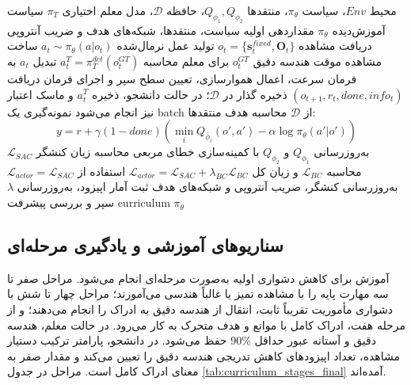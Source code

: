 \begin{algorithm}[htbp]
	\footnotesize
	\caption{فرآیند آموزش عامل  با سپر غیرفعال و لنگر رفتاری معلم}
	\label{alg:distilled_lstm_sac_training_final}
	\begin{algorithmic}[1]
		\REQUIRE محیط \(Env\)، سیاست \(\pi_\theta\)، منتقدها \(Q_{\phi_1},Q_{\phi_2}\)، حافظه \(\mathcal{D}\)، مدل معلم اختیاری \(\pi_T\)
		\ENSURE سیاست آموزش‌دیده \(\pi_\theta\)
		\STATE مقداردهی اولیه سیاست، منتقدها، شبکه‌های هدف و ضریب آنتروپی
		\STATE دریافت مشاهده \(o_t=\{\mathbf{s}^{fixed}_t,\mathbf{O}_t\}\)
		\STATE تولید عمل نرمال‌شده \(a_t\sim\pi_\theta(a|o_t)\)
		\STATE ساخت مشاهده موقت هندسه دقیق \(o^{GT}_t\) برای معلم
		\STATE محاسبه \(a^T_t=\pi_T^{det}(o^{GT}_t)\)
		\ENDIF
		\STATE تبدیل \(a_t\) به فرمان سرعت، اعمال هموارسازی، تعیین سطح سپر و اجرای فرمان
		\STATE دریافت \((o_{t+1},r_t,done,info_t)\)
		\STATE ذخیره گذار در \(\mathcal{D}\)؛ در حالت دانشجو، ذخیره \(a^T_t\) و ماسک اعتبار نیز انجام می‌شود
		\STATE نمونه‌گیری یک batch از \(\mathcal{D}\)
		\STATE محاسبه هدف منتقدها:
		\[
		y=r+\gamma(1-done)
		\left(
		\min_i Q_{\bar{\phi}_i}(o',a')-
		\alpha\log\pi_\theta(a'|o')
		\right)
		\]
		\STATE به‌روزرسانی \(Q_{\phi_1}\) و \(Q_{\phi_2}\) با کمینه‌سازی خطای مربعی
		\STATE محاسبه زیان کنشگر \(\mathcal{L}_{SAC}\)
		\STATE محاسبه \(\mathcal{L}_{BC}\) و زیان کل \(\mathcal{L}_{actor}=\mathcal{L}_{SAC}+\lambda_{BC}\mathcal{L}_{BC}\)
		\ELSE
		\STATE استفاده از \(\mathcal{L}_{actor}=\mathcal{L}_{SAC}\)
		\ENDIF
		\STATE به‌روزرسانی کنشگر، ضریب آنتروپی و شبکه‌های هدف
		\ENDIF
		\STATE ثبت آمار اپیزود، به‌روزرسانی \(\lambda\) سپر و بررسی پیشرفت curriculum
		\ENDIF
		\ENDFOR
		\RETURN \(\pi_\theta\)
	\end{algorithmic}
\end{algorithm}

\subsection{سناریوهای آموزشی و یادگیری مرحله‌ای}
\label{subsec:curriculum_learning_final}

آموزش برای کاهش دشواری اولیه به‌صورت مرحله‌ای انجام می‌شود. مراحل صفر تا سه مهارت پایه را با مشاهده تمیز یا غالباً هندسی می‌آموزند؛ مراحل چهار تا شش با دشواری مأموریت تقریباً ثابت، انتقال از هندسه دقیق به ادراک را انجام می‌دهند؛ و از مرحله هفت، ادراک کامل با موانع و هدف متحرک به کار می‌رود. در حالت معلم، هندسه دقیق و آستانه عبور حداقل \(90\%\) حفظ می‌شود. در دانشجو، پارامتر ترکیب دستیار مشاهده، تعداد اپیزودهای کاهش تدریجی هندسه دقیق را تعیین می‌کند و مقدار صفر به معنای ادراک کامل است. مراحل در جدول \ref{tab:curriculum_stages_final} آمده‌اند.

